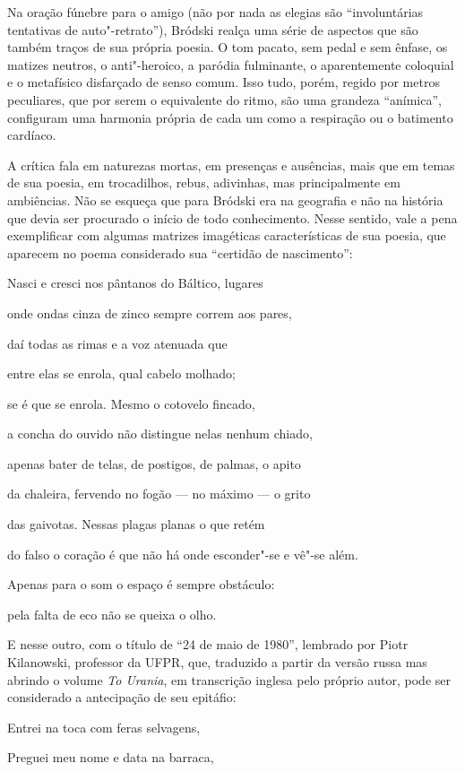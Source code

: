 Na oração fúnebre para o amigo (não por nada as elegias são
``involuntárias tentativas de auto"-retrato''), Bródski realça uma série
de aspectos que são também traços de sua própria poesia. O tom pacato,
sem pedal e sem ênfase, os matizes neutros, o anti"-heroico, a paródia
fulminante, o aparentemente coloquial e o metafísico disfarçado de senso
comum. Isso tudo, porém, regido por metros peculiares, que por serem o
equivalente do ritmo, são uma grandeza ``anímica'', configuram uma
harmonia própria de cada um como a respiração ou o batimento cardíaco.

A crítica fala em naturezas mortas, em presenças e ausências, mais que
em temas de sua poesia, em trocadilhos, rebus, adivinhas, mas
principalmente em ambiências. Não se esqueça que para Bródski era na
geografia e não na história que devia ser procurado o início de todo
conhecimento. Nesse sentido, vale a pena exemplificar com algumas
matrizes imagéticas características de sua poesia, que aparecem no poema
considerado sua ``certidão de nascimento'':

Nasci e cresci nos pântanos do Báltico, lugares

onde ondas cinza de zinco sempre correm aos pares,

daí todas as rimas e a voz atenuada que

entre elas se enrola, qual cabelo molhado;

se é que se enrola. Mesmo o cotovelo fincado,

a concha do ouvido não distingue nelas nenhum chiado,

apenas bater de telas, de postigos, de palmas, o apito

da chaleira, fervendo no fogão --- no máximo --- o grito

das gaivotas. Nessas plagas planas o que retém

do falso o coração é que não há onde esconder"-se e vê"-se além.

Apenas para o som o espaço é sempre obstáculo:

pela falta de eco não se queixa o olho.

E nesse outro, com o título de ``24 de maio de 1980'', lembrado por
Piotr Kilanowski, professor da UFPR, que, traduzido a partir da versão russa mas abrindo o volume
\emph{To Urania}, em transcrição inglesa pelo próprio
autor, pode ser considerado a antecipação de seu epitáfio:

Entrei na toca com feras selvagens,

Preguei meu nome e data na barraca,

